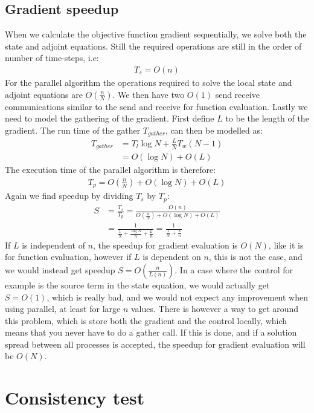 \subsection{Gradient speedup}
When we calculate the objective function gradient sequentially, we solve both the state and adjoint equations. Still the required operations are still in the order of number of time-steps, i.e:
\begin{align*}
T_s = O(n)
\end{align*}
For the parallel algorithm the operations required to solve the local state and adjoint equations are $O(\frac{n}{N})$. We then have two $O(1)$ send receive communications similar to the send and receive for function evaluation. Lastly we need to model the gathering of the gradient. First define $L$ to be the length of the gradient. The run time of the gather $T_{gather}$, can then be modelled as:
\begin{align*}
T_{gather} &= T_l\log N + \frac{L}{N}T_w(N-1) \\
&= O(\log N) + O(L)
\end{align*}
The execution time of the parallel algorithm is therefore:
\begin{align*}
T_p = O(\frac{n}{N}) + O(\log N) + O(L)
\end{align*}
Again we find speedup by dividing $T_s$ by $T_p$:
\begin{align*}
S &= \frac{T_s}{T_p} = \frac{O(n)}{O(\frac{n}{N}) + O(\log N) + O(L)} \\
&=\frac{1}{\frac{1}{N} + \frac{\log N}{n}+\frac{L}{n}} = \frac{1}{\frac{1}{N} +\frac{L}{n}}
\end{align*}
If $L$ is independent of $n$, the speedup for gradient evaluation is $O(N)$, like it is for function evaluation, however if $L$ is dependent on $n$, this is not the case, and we would instead get speedup $S=O(\frac{n}{L(n)})$. In a case where the control for example is the source term in the state equation, we would actually get $S=O(1)$, which is really bad, and we would not expect any improvement when using parallel, at least for large $n$ values. There is however a way to get around this problem, which is store both the gradient and the control locally, which means that you never have to do a gather call. If this is done, and if a solution spread between all processes is accepted, the speedup for gradient evaluation will be $O(N)$.
\section{Consistency test}
